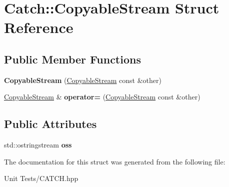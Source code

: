 \hypertarget{structCatch_1_1CopyableStream}{}\section{Catch\+:\+:Copyable\+Stream Struct Reference}
\label{structCatch_1_1CopyableStream}
\subsection*{Public Member Functions}
\begin{DoxyCompactItemize}
\item 
{\bfseries Copyable\+Stream} (\hyperlink{structCatch_1_1CopyableStream}{Copyable\+Stream} const \&other)\hypertarget{structCatch_1_1CopyableStream_a0e72dc16240653f52c17106f4bf34da8}{}\label{structCatch_1_1CopyableStream_a0e72dc16240653f52c17106f4bf34da8}

\item 
\hyperlink{structCatch_1_1CopyableStream}{Copyable\+Stream} \& {\bfseries operator=} (\hyperlink{structCatch_1_1CopyableStream}{Copyable\+Stream} const \&other)\hypertarget{structCatch_1_1CopyableStream_a1760fa29b38011c5845171260bec0966}{}\label{structCatch_1_1CopyableStream_a1760fa29b38011c5845171260bec0966}

\end{DoxyCompactItemize}
\subsection*{Public Attributes}
\begin{DoxyCompactItemize}
\item 
std\+::ostringstream {\bfseries oss}\hypertarget{structCatch_1_1CopyableStream_ae123fb4d673e7d7a13a3c5f6bc5d426c}{}\label{structCatch_1_1CopyableStream_ae123fb4d673e7d7a13a3c5f6bc5d426c}

\end{DoxyCompactItemize}


The documentation for this struct was generated from the following file\+:\begin{DoxyCompactItemize}
\item 
Unit Tests/C\+A\+T\+C\+H.\+hpp\end{DoxyCompactItemize}
